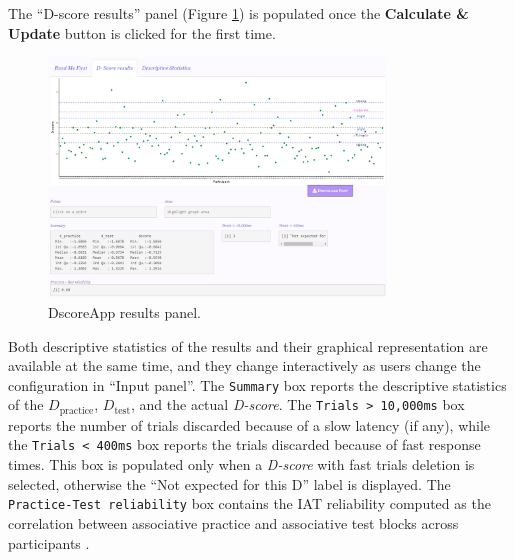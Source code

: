 \documentclass[12pt]{book}
\begin{document}
The ``D-score results'' panel (Figure \ref{fig:dscoreapp}) is populated once the \textbf{Calculate \& Update} button is clicked for the first time.  
%
\begin{figure}[h!]
	\centering 
	\includegraphics[width=0.8\textwidth]{resultsApp.png}
	\caption{DscoreApp results panel.}
	\label{fig:dscoreapp}
\end{figure}
%
Both descriptive statistics of the results and their graphical representation are available at the same time, and they change interactively as users change the configuration in ``Input panel''. The \texttt{Summary} box reports the descriptive statistics of the $D_{\text{practice}}$, $D_{\text{test}}$, and the actual \emph{D-score}. The \texttt{Trials > 10,000ms} box reports the number of trials discarded because of a slow latency (if any), while the \texttt{Trials < 400ms} box reports the trials discarded because of fast response times. This box is populated only when a \emph{D-score} with fast trials deletion is selected, otherwise the ``Not expected for this D'' label is displayed. The \texttt{Practice-Test reliability} box contains the IAT reliability computed as the correlation between associative practice and associative test blocks across participants \cite{gaw2017}.
\end{document}
